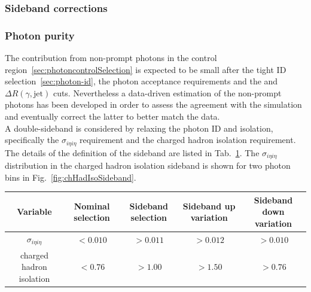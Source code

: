 \subsubsection{Sideband corrections}
\label{sec:sideband-corrections}


\subsubsection{Photon purity}
\label{sec:photon-purity}
The contribution from non-prompt photons in the \gj control region~\ref{sec:photoncontrolSelection} 
is expected to be small after the tight ID selection~\ref{sec:photon-id}, the photon acceptance requirements 
and the \alphat and $\Delta R (\gamma,\mathrm{jet})$ cuts. 
Nevertheless a data-driven estimation of the non-prompt photons has been developed 
in order to assess the agreement with the simulation and eventually correct the latter 
to better match the data. \\
A double-sideband is considered by relaxing the photon ID and isolation, 
specifically the $\sigma_{i\eta i\eta}$ requirement and the charged hadron isolation requirement. 
The details of the definition of the sideband are listed in Tab.~\ref{tab:phoPurity-sideband}. 
The $\sigma_{i\eta i\eta}$ distribution in the charged hadron isolation sideband is shown for two 
photon \pt bins in Fig.~\ref{fig:chHadIsoSideband}.

\begin{table}[h!]
  \label{tab:phoPurity-sideband}
  \centering
  \footnotesize
  \begin{tabular}{ ccccc }
    \hline
    \hline
    Variable & Nominal selection & Sideband selection & Sideband up variation & Sideband down variation \\
    \hline
    $\sigma_{i\eta i\eta}$   & $<0.010$ & $>0.011$ & $>0.012$ & $>0.010$ \\
    charged hadron isolation & $<0.76$  & $>1.00$  & $>1.50$  & $>0.76$  \\ 
    \hline
    \hline
  \end{tabular}
\end{table}

